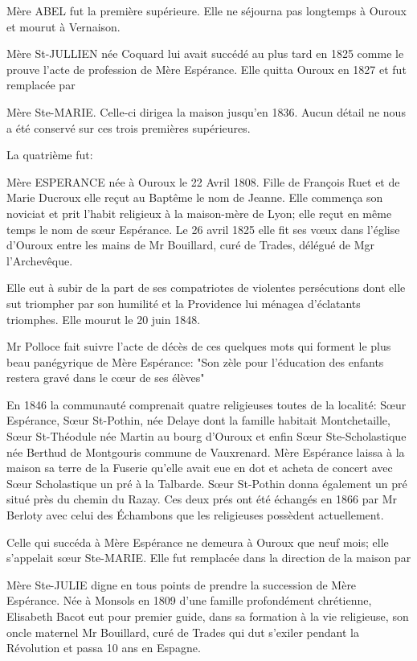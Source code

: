 Mère ABEL fut la première supérieure. Elle ne séjourna pas longtemps à Ouroux et mourut à Vernaison.

Mère St-JULLIEN née Coquard lui avait succédé au plus tard en 1825 comme le prouve l'acte de profession de Mère Espérance. Elle quitta Ouroux en 1827 et fut remplacée par

Mère Ste-MARIE. Celle-ci dirigea la maison jusqu'en 1836. Aucun détail ne nous a été conservé sur ces trois premières supérieures.

La quatrième fut:

Mère ESPERANCE née à Ouroux le 22 Avril 1808. Fille de François Ruet et de Marie Ducroux elle reçut au Baptême le nom de Jeanne. Elle commença son noviciat et prit l'habit religieux à la maison-mère de Lyon; elle reçut en même temps le nom de sœur Espérance. Le 26 avril 1825 elle fit ses vœux dans l'église d'Ouroux entre les mains de Mr Bouillard, curé de Trades, délégué de Mgr l'Archevêque.

Elle eut à subir de la part de ses compatriotes de violentes persécutions dont elle sut triompher par son humilité et la Providence lui ménagea d'éclatants triomphes. Elle mourut le 20 juin 1848.

Mr Polloce fait suivre l'acte de décès de ces quelques mots qui forment le plus beau panégyrique de Mère Espérance: "Son zèle pour l'éducation des enfants restera gravé dans le cœur de ses élèves"

En 1846 la communauté comprenait quatre religieuses toutes de la localité: Sœur Espérance, Sœur St-Pothin, née Delaye dont la famille habitait Montchetaille, Sœur St-Théodule née Martin au bourg d'Ouroux et enfin Sœur Ste-Scholastique née Berthud de Montgouris commune de Vauxrenard. Mère Espérance laissa à la maison sa terre de la Fuserie qu'elle avait eue en dot et acheta de concert avec Sœur Scholastique un pré à la Talbarde. Sœur St-Pothin donna également un pré situé près du chemin du Razay. Ces deux prés ont été échangés en 1866 par Mr Berloty avec celui des Échambons que les
religieuses possèdent actuellement.

Celle qui succéda à Mère Espérance ne demeura à Ouroux que neuf mois; elle s'appelait sœur Ste-MARIE. Elle fut remplacée dans la direction de la maison par

Mère Ste-JULIE digne en tous points de prendre la succession de Mère Espérance. Née à Monsols en 1809 d'une famille profondément chrétienne, Elisabeth Bacot eut pour premier guide, dans sa formation à la vie religieuse, son oncle maternel Mr Bouillard, curé de Trades qui dut s'exiler pendant la Révolution et passa 10 ans en Espagne.


